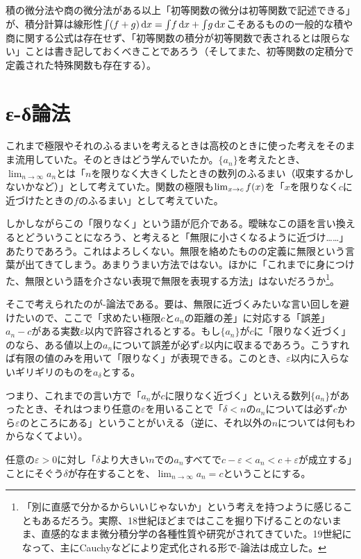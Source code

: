 積の微分法や商の微分法がある以上「初等関数の微分は初等関数で記述できる」が、積分計算は線形性$\int\pare{f+g}\,\dx=\int\!f\,\dx+\int\!g\,\dx$こそあるものの一般的な積や商に関する公式は存在せず、「初等関数の積分が初等関数で表されるとは限らない」ことは書き記しておくべきことであろう（そしてまた、初等関数の定積分で定義された特殊関数も存在する）。

\clearpage
\section{ε-δ論法}
これまで極限やそれのふるまいを考えるときは高校のときに使った考えをそのまま流用していた。そのときはどう学んでいたか。$\{a_n\}$を考えたとき、$\lim_{n\to\infty}a_n$とは「$n$を限りなく大きくしたときの数列のふるまい（収束するかしないかなど）」として考えていた。関数の極限も$\lim_{x\to c}f\pare{x}$を「$x$を限りなく$c$に近づけたときの$f$のふるまい」として考えていた。

しかしながらこの「限りなく」という語が厄介である。曖昧なこの語を言い換えるとどういうことになろう、と考えると「無限に小さくなるように近づけ……」あたりであろう。これはよろしくない。無限を絡めたものの定義に無限という言葉が出てきてしまう。あまりうまい方法ではない。ほかに「これまでに身につけた、無限という語を介さない表現で無限を表現する方法」はないだろうか\footnote{「別に直感で分かるからいいじゃないか」という考えを持つように感じることもあるだろう。実際、18世紀ほどまではここを掘り下げることのないまま、直感的なまま微分積分学の各種性質や研究がされてきていた。19世紀になって、主にCauchyなどにより定式化される形で\textit{\varepsilon}-\textit{\delta}論法は成立した。}。

そこで考えられたのが\textit{\varepsilon}-\textit{\delta}論法である。要は、無限に近づくみたいな言い回しを避けたいので、ここで「求めたい極限$c$と$a_n$の距離の差」に対応する「誤差」$a_n-c$がある実数$\varepsilon$以内で許容されるとする。もし$\{a_n\}$が$c$に「限りなく近づく」のなら、ある値以上の$a_n$について誤差が必ず$\varepsilon$以内に収まるであろう。こうすれば有限の値のみを用いて「限りなく」が表現できる。このとき、$\varepsilon$以内に入らないギリギリのものを$a_\delta$とする。

つまり、これまでの言い方で「$a_n$が$c$に限りなく近づく」といえる数列$\{a_n\}$があったとき、それはつまり任意の$\varepsilon$を用いることで「$\delta<n$の$a_n$については必ず$c$から$\varepsilon$のところにある」ということがいえる（逆に、それ以外の$n$については何もわからなくてよい）。

\begin{defi}
    任意の$\varepsilon\!>\!0$に対し「$\delta$より大きい$n$での$a_n$すべてで$c-\varepsilon<a_n<c+\varepsilon$が成立する」ことにそぐう$\delta$が存在することを、$\lim_{n\to\infty}a_n=c$ということにする。
\end{defi}

